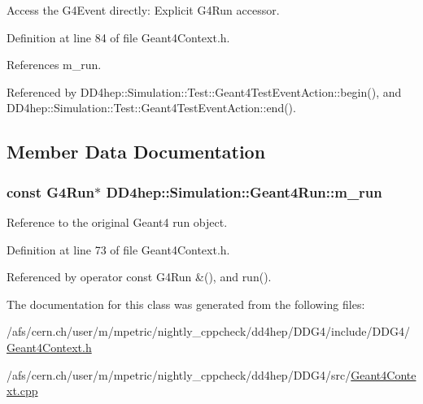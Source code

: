 Access the G4Event directly: Explicit G4Run accessor. 

Definition at line 84 of file Geant4Context.h.

References m\_\-run.

Referenced by DD4hep::Simulation::Test::Geant4TestEventAction::begin(), and DD4hep::Simulation::Test::Geant4TestEventAction::end().

\subsection{Member Data Documentation}
\hypertarget{class_d_d4hep_1_1_simulation_1_1_geant4_run_a9749412423798b1b248adc8c85acbcc1}{
\subsubsection[{m\_\-run}]{\setlength{\rightskip}{0pt plus 5cm}const G4Run$\ast$ {\bf DD4hep::Simulation::Geant4Run::m\_\-run}}}
\label{class_d_d4hep_1_1_simulation_1_1_geant4_run_a9749412423798b1b248adc8c85acbcc1}


Reference to the original Geant4 run object. 

Definition at line 73 of file Geant4Context.h.

Referenced by operator const G4Run \&(), and run().

The documentation for this class was generated from the following files:\begin{DoxyCompactItemize}
\item 
/afs/cern.ch/user/m/mpetric/nightly\_\-cppcheck/dd4hep/DDG4/include/DDG4/\hyperlink{_geant4_context_8h}{Geant4Context.h}\item 
/afs/cern.ch/user/m/mpetric/nightly\_\-cppcheck/dd4hep/DDG4/src/\hyperlink{_geant4_context_8cpp}{Geant4Context.cpp}\end{DoxyCompactItemize}
